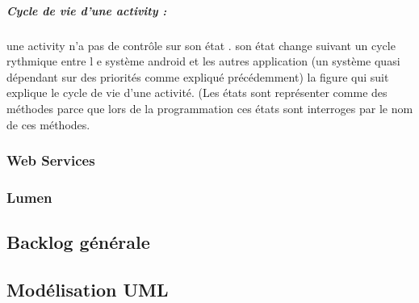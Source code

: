 \subparagraph{Cycle de vie d'une activity :}

une activity n'a pas de contrôle sur son état . 
son état change suivant un cycle rythmique entre l
e système android et les autres application (un système quasi 
dépendant sur des priorités comme expliqué précédemment) la figure qui suit 
explique le cycle de vie d'une activité. (Les états sont représenter comme des 
méthodes parce que lors de la programmation ces états sont interroges par le nom 
de ces méthodes.



\subsubsection{Web Services}

\subsubsection{Lumen}

\subsection{Backlog générale}

\subsection{Modélisation UML}
